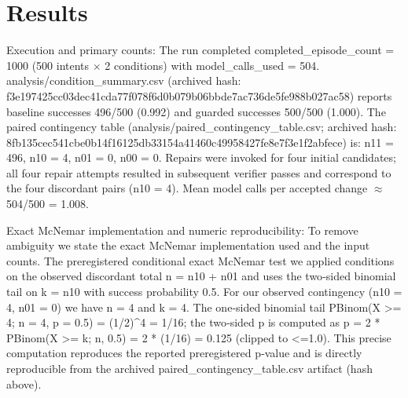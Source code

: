 \documentclass[conference]{IEEEtran}
\begin{document}
\section{Results}
Execution and primary counts: The run completed completed\_episode\_count = 1000 (500 intents \ensuremath{\times} 2 conditions) with model\_calls\_used = 504. analysis/condition\_summary.csv (archived hash: f3e19742\allowbreak{}5cc03dec\allowbreak{}41cda77f\allowbreak{}078f6d0b\allowbreak{}079b06bb\allowbreak{}de7ac736\allowbreak{}de5fe988\allowbreak{}b027ac58) reports baseline successes 496/500 (0.992) and guarded successes 500/500 (1.000). The paired contingency table (analysis/paired\_contingency\_table.csv; archived hash: 8fb135ce\allowbreak{}c541cbe0\allowbreak{}b14f1612\allowbreak{}5db33154\allowbreak{}a41460c4\allowbreak{}9958427f\allowbreak{}e8e7f3e1\allowbreak{}f2abfece) is: n11 = 496, n10 = 4, n01 = 0, n00 = 0. Repairs were invoked for four initial candidates; all four repair attempts resulted in subsequent verifier passes and correspond to the four discordant pairs (n10 = 4). Mean model calls per accepted change \ensuremath{\approx} 504/500 = 1.008.

Exact McNemar implementation and numeric reproducibility: To remove ambiguity we state the exact McNemar implementation used and the input counts. The preregistered conditional exact McNemar test we applied conditions on the observed discordant total n = n10 + n01 and uses the two‑sided binomial tail on k = n10 with success probability 0.5. For our observed contingency (n10 = 4, n01 = 0) we have n = 4 and k = 4. The one‑sided binomial tail PBinom(X >= 4; n = 4, p = 0.5) = (1/2)\textasciicircum{}4 = 1/16; the two‑sided p is computed as p = 2 * PBinom(X >= k; n, 0.5) = 2 * (1/16) = 0.125 (clipped to <=1.0). This precise computation reproduces the reported preregistered p‑value and is directly reproducible from the archived paired\_contingency\_table.csv artifact (hash above).
\end{document}
